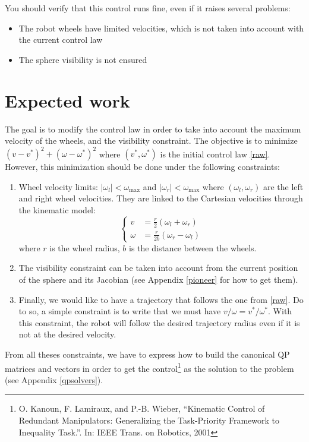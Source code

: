 \documentclass{ecnreport}
\begin{document}
You should verify that this control runs fine, even if it raises several problems:
\begin{itemize}
 \item The robot wheels have limited velocities, which is not taken into account with the current control law
 \item The sphere visibility is not ensured
\end{itemize}


\section{Expected work}

The goal is to modify the control law in order to take into account the maximum velocity of the wheels, and the visibility constraint.
The objective is to minimize $(v-v^*)^2 + (\omega-\omega^*)^2$ where $(v^*,\omega^*)$ is the initial control law \eqref{raw}.
However, this minimization should be done under the following constraints:

\begin{enumerate}
 \item Wheel velocity limits: $|\omega_l| < \omega_{\max}$ and $|\omega_r| < \omega_{\max}$ where $(\omega_l, \omega_r)$ are the left and right wheel velocities. 
 They are linked to the Cartesian velocities through the kinematic model:
\begin{equation}
  \left\{\begin{array}{ll}
         v &= \frac{r}{2}(\omega_l + \omega_r) \\ \omega &=  \frac{r}{2b}(\omega_r - \omega_l)
        \end{array}\right.
\end{equation}where $r$ is the wheel radius, $b$ is the distance between the wheels.
\item The visibility constraint can be taken into account from the current position of the sphere and its Jacobian (see Appendix \ref{pioneer} for how to get them).
\item Finally, we would like to have a trajectory that follows the one from \eqref{raw}. Do to so, a simple constraint is to write that we must have $v/\omega = v^*/\omega^*$. With this constraint, 
the robot will follow the desired trajectory radius even if it is not at the desired velocity.
\end{enumerate}
From all theses constraints, we have to express how to build the canonical QP matrices and vectors in order to get the control\footnote{ O. Kanoun, F. Lamiraux, and P.-B. Wieber, “Kinematic Control of
	Redundant Manipulators: Generalizing the Task-Priority Framework to Inequality
	Task.”. In: IEEE Trans. on Robotics, 2001} as the solution to the problem (see Appendix \ref{qpsolvers}).
\end{document}
